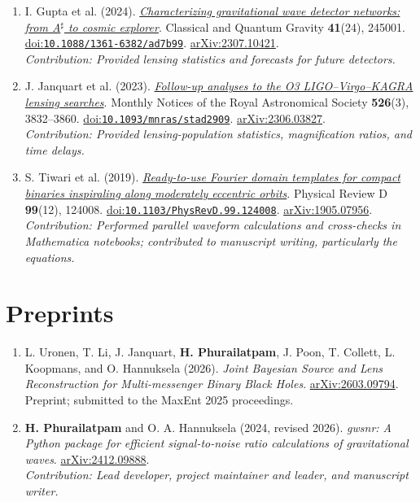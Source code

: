 \documentclass[10pt]{article}
\begin{document}
\begin{enumerate}
\item I. Gupta et al. (2024). \href{https://doi.org/10.1088/1361-6382/ad7b99}{\textit{Characterizing gravitational wave detector networks: from A$^\sharp$ to cosmic explorer}}. Classical and Quantum Gravity \textbf{41}(24), 245001. \href{https://doi.org/10.1088/1361-6382/ad7b99}{doi:\nolinkurl{10.1088/1361-6382/ad7b99}}. \href{https://arxiv.org/abs/2307.10421}{arXiv:2307.10421}.\\\emph{Contribution: Provided lensing statistics and forecasts for future detectors.}
\item J. Janquart et al. (2023). \href{https://doi.org/10.1093/mnras/stad2909}{\textit{Follow-up analyses to the O3 LIGO--Virgo--KAGRA lensing searches}}. Monthly Notices of the Royal Astronomical Society \textbf{526}(3), 3832--3860. \href{https://doi.org/10.1093/mnras/stad2909}{doi:\nolinkurl{10.1093/mnras/stad2909}}. \href{https://arxiv.org/abs/2306.03827}{arXiv:2306.03827}.\\\emph{Contribution: Provided lensing-population statistics, magnification ratios, and time delays.}
\item S. Tiwari et al. (2019). \href{https://doi.org/10.1103/PhysRevD.99.124008}{\textit{Ready-to-use Fourier domain templates for compact binaries inspiraling along moderately eccentric orbits}}. Physical Review D \textbf{99}(12), 124008. \href{https://doi.org/10.1103/PhysRevD.99.124008}{doi:\nolinkurl{10.1103/PhysRevD.99.124008}}. \href{https://arxiv.org/abs/1905.07956}{arXiv:1905.07956}.\\\emph{Contribution: Performed parallel waveform calculations and cross-checks in Mathematica notebooks; contributed to manuscript writing, particularly the equations.}
\end{enumerate}
\section*{Preprints}
\begin{enumerate}[start=13]
\item L. Uronen, T. Li, J. Janquart, \textbf{H. Phurailatpam}, J. Poon, T. Collett, L. Koopmans, and O. Hannuksela (2026). \textit{Joint Bayesian Source and Lens Reconstruction for Multi-messenger Binary Black Holes}. \href{https://arxiv.org/abs/2603.09794}{arXiv:2603.09794}. Preprint; submitted to the MaxEnt 2025 proceedings.
\item \textbf{H. Phurailatpam} and O. A. Hannuksela (2024, revised 2026). \textit{gwsnr: A Python package for efficient signal-to-noise ratio calculations of gravitational waves}. \href{https://arxiv.org/abs/2412.09888}{arXiv:2412.09888}.\\\emph{Contribution: Lead developer, project maintainer and leader, and manuscript writer.}
\end{enumerate}
\end{document}

